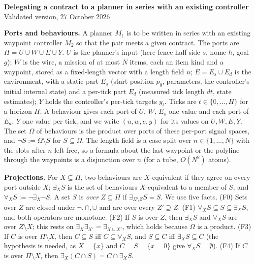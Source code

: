 \documentclass[10pt,a4paper]{article}
\makeatletter
\renewcommand\section{\@startsection{section}{1}{0pt}{0.8ex plus .2ex}{0.4ex}{\normalfont\large\bfseries}}
\newcommand{\ex}{\exists}
\newcommand{\fa}{\forall}
\makeatother
\begin{document}
\fontsize{9}{10.3}\selectfont
\begin{center}
{\Large\bfseries Delegating a contract to a planner in series with an existing controller}\\[2pt]
Validated version, 27 October 2026
\end{center}

\section{Problem}

\textbf{Ports and behaviours.} A planner $M_1$ is to be written in series with an existing waypoint controller $M_2$ so that the pair meets a given contract. The ports are $\Pi=U\cup W\cup E\cup Y$. $U$ is the planner's input (here fence half-side $s$, home $h$, goal $g$); $W$ is the wire, a mission of at most $N$ items, each an item kind and a waypoint, stored as a fixed-length vector with a length field $n$; $E=E_s\cup E_d$ is the environment, with a static part $E_s$ (start position $p_0$, parameters, the controller's initial internal state) and a per-tick part $E_d$ (measured tick length $dt$, state estimates); $Y$ holds the controller's per-tick targets $y_t$. Ticks are $t\in\{0,\dots,H\}$ for a horizon $H$. A behaviour gives each port of $U$, $W$, $E_s$ one value and each port of $E_d$, $Y$ one value per tick, and we write $(u,w,e,y)$ for its values on $U,W,E,Y$. The set $\Omega$ of behaviours is the product over ports of these per-port signal spaces, and $\lnot S:=\Omega\setminus S$ for $S\subseteq\Omega$. The length field is a case split over $n\in\{1,\dots,N\}$ with the slots after $n$ left free, so a formula about the last waypoint or the polyline through the waypoints is a disjunction over $n$ (for a tube, $O(N^2)$ atoms).

\textbf{Projections.} For $X\subseteq\Pi$, two behaviours are $X$-equivalent if they agree on every port outside $X$; $\ex_X S$ is the set of behaviours $X$-equivalent to a member of $S$, and $\fa_X S:=\lnot\ex_X\lnot S$. A set $S$ is \emph{over} $Z\subseteq\Pi$ if $\ex_{\Pi\setminus Z}S=S$. We use five facts. (F0) Sets over $Z$ are closed under $\lnot,\cap,\cup$ and are over every $Z'\supseteq Z$. (F1) $\fa_X S\subseteq S\subseteq\ex_X S$, and both operators are monotone. (F2) If $S$ is over $Z$, then $\ex_X S$ and $\fa_X S$ are over $Z\setminus X$; this rests on $\ex_X\ex_{X'}=\ex_{X\cup X'}$, which holds because $\Omega$ is a product. (F3) If $C$ is over $\Pi\setminus X$, then $C\subseteq S$ iff $C\subseteq\fa_X S$, and $S\subseteq C$ iff $\ex_X S\subseteq C$ (the hypothesis is needed, as $X=\{x\}$ and $C=S=\{x=0\}$ give $\fa_X S=\emptyset$). (F4) If $C$ is over $\Pi\setminus X$, then $\ex_X(C\cap S)=C\cap\ex_X S$.
\end{document}
